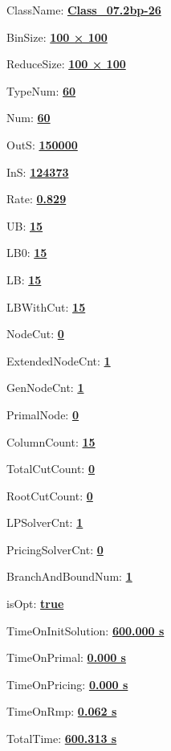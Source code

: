 \documentclass[11pt]{article}
\begin{document}
\pagestyle{empty}


ClassName: \underline{\textbf{Class_07.2bp-26}}
\par
BinSize: \underline{\textbf{100 × 100}}
\par
ReduceSize: \underline{\textbf{100 × 100}}
\par
TypeNum: \underline{\textbf{60}}
\par
Num: \underline{\textbf{60}}
\par
OutS: \underline{\textbf{150000}}
\par
InS: \underline{\textbf{124373}}
\par
Rate: \underline{\textbf{0.829}}
\par
UB: \underline{\textbf{15}}
\par
LB0: \underline{\textbf{15}}
\par
LB: \underline{\textbf{15}}
\par
LBWithCut: \underline{\textbf{15}}
\par
NodeCut: \underline{\textbf{0}}
\par
ExtendedNodeCnt: \underline{\textbf{1}}
\par
GenNodeCnt: \underline{\textbf{1}}
\par
PrimalNode: \underline{\textbf{0}}
\par
ColumnCount: \underline{\textbf{15}}
\par
TotalCutCount: \underline{\textbf{0}}
\par
RootCutCount: \underline{\textbf{0}}
\par
LPSolverCnt: \underline{\textbf{1}}
\par
PricingSolverCnt: \underline{\textbf{0}}
\par
BranchAndBoundNum: \underline{\textbf{1}}
\par
isOpt: \underline{\textbf{true}}
\par
TimeOnInitSolution: \underline{\textbf{600.000 s}}
\par
TimeOnPrimal: \underline{\textbf{0.000 s}}
\par
TimeOnPricing: \underline{\textbf{0.000 s}}
\par
TimeOnRmp: \underline{\textbf{0.062 s}}
\par
TotalTime: \underline{\textbf{600.313 s}}
\par
\newpage


\end{document}
